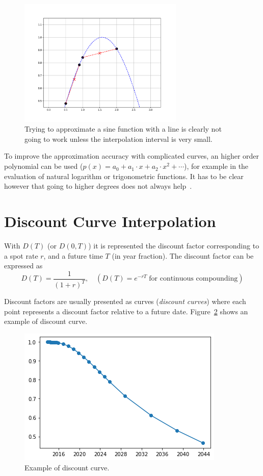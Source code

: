 \begin{figure}
  \centering
  \includegraphics[width=0.7\textwidth]{figures/wrong_interp.png}
  \caption{Trying to approximate a sine function with a line is clearly not going to work unless the interpolation interval is very small.}
  \label{fig:sine_interp}
\end{figure}

To improve the approximation accuracy with complicated curves, an higher order polynomial can be used ($p(x)=a_0 + a_1\cdot x + a_2\cdot x^2+\cdots$), for example in the evaluation of natural logarithm or trigonometric functions. It has to be clear however that going to higher degrees does not always help~\cite{bib:runge}.

\section{Discount Curve Interpolation}
\label{discount-curve-interpolation}
With $D(T)$ (or $D(0,T)$) it is represented the discount factor corresponding to a spot rate $r$, and a future time $T$ (in year fraction). The discount factor can be expressed as
\begin{equation}
	D(T)=\frac{1}{(1+r)^T},\quad(D(T)=e^{-rT}\;\textrm{for continuous compounding})
\label{eq:discount_factor}
\end{equation}

Discount factors are usually presented as curves (\emph{discount curves}) where each point represents a discount factor relative to a future date. Figure~\ref{fig:example_discount_curve} shows an example of discount curve.

\begin{figure}[htbp]
    \centering
	\includegraphics[width=0.7\linewidth]{figures/discount_curve}
	\caption{Example of discount curve.}
	\label{fig:example_discount_curve}
\end{figure}


